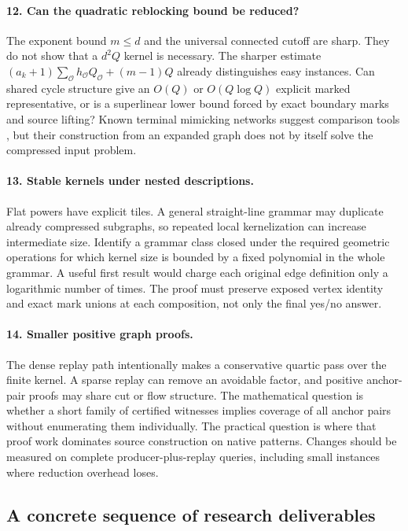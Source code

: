 \paragraph{12. Can the quadratic reblocking bound be reduced?}
The exponent bound $m\leq d$ and the universal connected cutoff are sharp.
They do not show that a $d^2Q$ kernel is necessary. The sharper estimate
$(a_k+1)\sum_{\mathcal O}h_{\mathcal O}Q_{\mathcal O}+(m-1)Q$ already
distinguishes easy instances. Can shared cycle structure give an $O(Q)$ or
$O(Q\log Q)$ explicit marked representative, or is a superlinear lower bound
forced by exact boundary marks and source lifting? Known terminal mimicking
networks suggest comparison tools \cite{chalermsook2021,liu2023}, but their
construction from an expanded graph does not by itself solve the compressed
input problem.

\paragraph{13. Stable kernels under nested descriptions.}
Flat powers have explicit tiles. A general straight-line grammar may duplicate
already compressed subgraphs, so repeated local kernelization can increase
intermediate size. Identify a grammar class closed under the required
geometric operations for which kernel size is bounded by a fixed polynomial
in the whole grammar. A useful first result would charge each original edge
definition only a logarithmic number of times. The proof must preserve exposed
vertex identity and exact mark unions at each composition, not only the final
yes/no answer.

\paragraph{14. Smaller positive graph proofs.}
The dense replay path intentionally makes a conservative quartic pass over
the finite kernel. A sparse replay can remove an avoidable factor, and
positive anchor-pair proofs may share cut or flow structure. The mathematical
question is whether a short family of certified witnesses implies coverage
of all anchor pairs without enumerating them individually. The practical
question is where that proof work dominates source construction on native
patterns. Changes should be measured on complete producer-plus-replay queries,
including small instances where reduction overhead loses.

\subsection{A concrete sequence of research deliverables}


